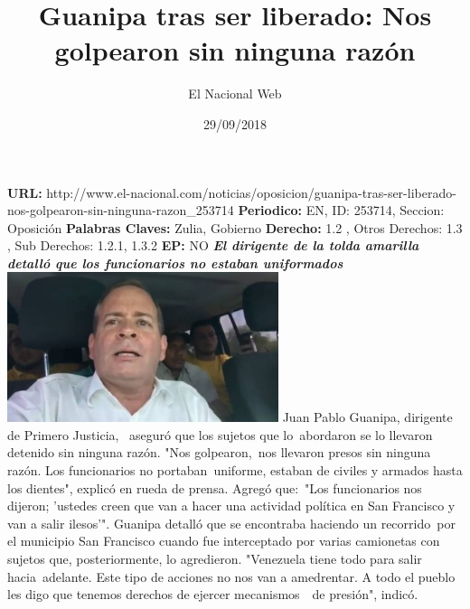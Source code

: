 \documentclass{article}%
\title{\textbf{Guanipa tras ser liberado: Nos golpearon sin ninguna razón}}%
\author{El Nacional Web}%
\date{29/09/2018}%
\begin{document}
%
\normalsize%
\maketitle%
\textbf{URL: }%
http://www.el{-}nacional.com/noticias/oposicion/guanipa{-}tras{-}ser{-}liberado{-}nos{-}golpearon{-}sin{-}ninguna{-}razon\_253714\newline%
%
\textbf{Periodico: }%
EN, %
ID: %
253714, %
Seccion: %
Oposición\newline%
%
\textbf{Palabras Claves: }%
Zulia, Gobierno\newline%
%
\textbf{Derecho: }%
1.2%
, Otros Derechos: %
1.3%
, Sub Derechos: %
1.2.1, 1.3.2%
\newline%
%
\textbf{EP: }%
NO\newline%
\newline%
%
\textbf{\textit{El dirigente de la tolda amarilla detalló que los funcionarios no estaban uniformados~}}%
\newline%
\newline%
%
\includegraphics[width=300px]{45.jpg}%
\newline%
%
Juan Pablo Guanipa, dirigente de Primero Justicia,~ aseguró que los sujetos que lo~abordaron se lo llevaron detenido sin ninguna razón.%
\newline%
%
"Nos golpearon,~nos llevaron presos sin ninguna razón. Los funcionarios no portaban~uniforme, estaban de civiles y armados hasta los dientes", explicó en rueda de prensa.%
\newline%
%
Agregó que:~"Los funcionarios nos dijeron; 'ustedes creen que van a hacer una actividad política en San Francisco y van a salir ilesos'".%
\newline%
%
Guanipa detalló que se encontraba haciendo un recorrido~por el municipio San Francisco cuando fue interceptado por varias camionetas con sujetos que, posteriormente, lo agredieron.%
\newline%
%
"Venezuela tiene todo para salir hacia~adelante. Este tipo de acciones no nos van a amedrentar. A todo el pueblo les digo que tenemos derechos de ejercer mecanismos~~de presión", indicó.%
\newline%
%
\end{document}
